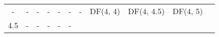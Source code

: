 \documentclass{article}
\begin{document}
\begin{longtable}[c]{@{}cllllllllll@{}}
\begin{minipage}[t]{0.15\columnwidth}
-
\strut\end{minipage} &
\begin{minipage}[t]{0.13\columnwidth}\raggedright\strut
-
\strut\end{minipage} &
\begin{minipage}[t]{0.15\columnwidth}\raggedright\strut
-
\strut\end{minipage} &
\begin{minipage}[t]{0.13\columnwidth}\raggedright\strut
-
\strut\end{minipage} &
\begin{minipage}[t]{0.15\columnwidth}\raggedright\strut
-
\strut\end{minipage} &
\begin{minipage}[t]{0.13\columnwidth}\raggedright\strut
-
\strut\end{minipage} &
\begin{minipage}[t]{0.15\columnwidth}\raggedright\strut
-
\strut\end{minipage} &
\begin{minipage}[t]{0.13\columnwidth}\raggedright\strut
DF(4, 4)
\strut\end{minipage} &
\begin{minipage}[t]{0.15\columnwidth}\raggedright\strut
DF(4, 4.5)
\strut\end{minipage} &
\begin{minipage}[t]{0.13\columnwidth}\raggedright\strut
DF(4, 5)
\strut\end{minipage}\tabularnewline
\begin{minipage}[t]{0.08\columnwidth}\centering\strut
4.5
\strut\end{minipage} &
\begin{minipage}[t]{0.15\columnwidth}\raggedright\strut
-
\strut\end{minipage} &
\begin{minipage}[t]{0.13\columnwidth}\raggedright\strut
-
\strut\end{minipage} &
\begin{minipage}[t]{0.15\columnwidth}\raggedright\strut
-
\strut\end{minipage} &
\begin{minipage}[t]{0.13\columnwidth}\raggedright\strut
-
\strut\end{minipage} &
\begin{minipage}[t]{0.15\columnwidth}\raggedright\strut
-
\strut\end{minipage} &
\begin{minipage}[t]{0.13\columnwidth}\raggedright\strut

\end{minipage}
\end{longtable}
\end{document}
